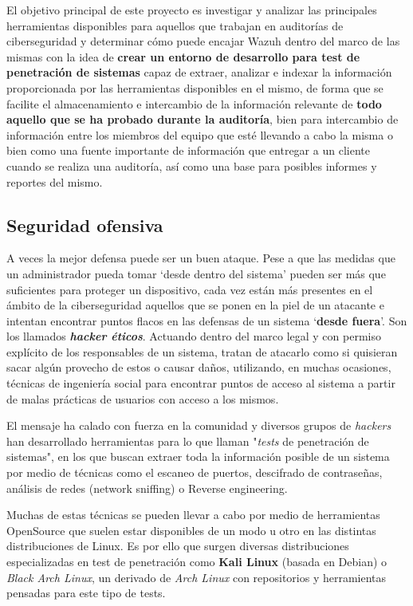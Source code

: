 El objetivo principal de este proyecto es investigar y analizar las principales herramientas disponibles para aquellos que trabajan en auditorías de ciberseguridad y determinar cómo puede encajar Wazuh dentro del marco de las mismas con la idea de \textbf{crear un entorno de desarrollo para test de penetración de sistemas} capaz de extraer, analizar e indexar la información proporcionada por las herramientas disponibles en el mismo, de forma que se facilite el almacenamiento e intercambio de la información relevante de \textbf{todo aquello que se ha probado durante la auditoría}, bien para intercambio de información entre los miembros del equipo que esté llevando a cabo la misma o bien como una fuente importante de información que entregar a un cliente cuando se realiza una auditoría, así como una base para posibles informes y reportes del mismo.

\subsection{Seguridad ofensiva}

A veces la mejor defensa puede ser un buen ataque. Pese a que las medidas que un administrador pueda tomar `desde dentro del sistema' pueden ser más que suficientes para proteger un dispositivo, cada vez están más presentes en el ámbito de la ciberseguridad aquellos que se ponen en la piel de un atacante e intentan encontrar puntos flacos en las defensas de un sistema `\textbf{desde fuera}'. Son los llamados \textbf{\textit{hacker éticos}}. Actuando dentro del marco legal y con permiso explícito de los responsables de un sistema, tratan de atacarlo como si quisieran sacar algún provecho de estos o causar daños, utilizando, en muchas ocasiones, técnicas de ingeniería social para encontrar puntos de acceso al sistema a partir de malas prácticas de usuarios con acceso a los mismos.

El mensaje ha calado con fuerza en la comunidad y diversos grupos de \textit{hackers} han desarrollado herramientas para lo que llaman "\textit{tests} de penetración de sistemas", en los que buscan extraer toda la información posible de un sistema por medio de técnicas como el escaneo de puertos, descifrado de contraseñas, análisis de redes (\gls{network sniffing}) o \gls{Reverse engineering}. 

Muchas de estas técnicas se pueden llevar a cabo por medio de herramientas OpenSource que suelen estar disponibles de un modo u otro en las distintas distribuciones de Linux. Es por ello que surgen diversas distribuciones especializadas en test de penetración como \textbf{Kali Linux} (basada en Debian) o \textit{Black Arch Linux}, un derivado de \textit{Arch Linux} con repositorios y herramientas pensadas para este tipo de tests.





